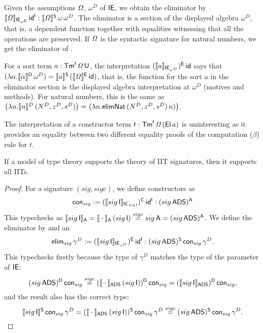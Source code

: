\documentclass[a4paper,UKenglish,cleveref, autoref]{lipics-v2019}
\begin{document}
\begin{example}
  Given the assumptions $\mathit{\Omega}$, $\omega^D$ of $\mathsf{IE}$, we obtain the
  eliminator by
  $\llbracket\mathit{\Omega}\rrbracket_{\mathsf{IE}_{\omega^{\mathsf{D}}}}\,\mathsf{id}^{\mathsf{I}} :
  \llbracket\mathit{\Omega}\rrbracket^{\mathsf{S}}\,\omega\,\omega^D$. The eliminator is a section of
  the displayed algebra $\omega^D$, that is, a dependent function
  together with equalities witnessing that all the operations are
  preserved. If $\mathit{\Omega}$ is the syntactic signature for natural
  numbers, we get the eliminator of .

  For a sort term $a:\mathsf{Tm}^{\mathsf{I}}\,\mathit{\Omega}\,\mathsf{U}$, the interpretation
  $(\llbracket a\rrbracket_{\mathsf{IE}_{\omega^D}})^{\mathsf{E}}\,\mathsf{id}$ says that
  $(\lambda\alpha.\llbracket\alpha\rrbracket^{\mathsf{D}}\,\omega^D) = \llbracket
  a\rrbracket^{\mathsf{S}}\,(\llbracket\mathit{\Omega}\rrbracket^{\mathsf{E}}\,\mathsf{id})$, that is, the function for the sort
  $a$ in the eliminator section is the displayed algebra
  interpretation at $\omega^D$ (motives and methods). For natural
  numbers, this is the same as
  $\big(\lambda n.\llbracket n\rrbracket^D\,(N^D,z^D,s^D)\big) = \big(\lambda
  n.\mathsf{elimNat}\,(N^D,z^D,s^D)\,n)\big)$.

  The interpretation of a constructor term
  $t:\mathsf{Tm}^{\mathsf{I}}\,\mathit{\Omega}\,(\mathsf{El}\,a)$ is uninteresting as it provides an
  equality between two different equality proofs of the computation
  ($\beta$) rule for $t$.
\end{example}

\begin{theorem}\label{th:tosToIITs}
  If a model of type theory supports the theory of IIT signatures,
  then it supports all IITs.
\end{theorem}
\begin{proof}
  For a signature $({sig},{sigc})$, we define constructors as
  \[
    \mathsf{con}_{sig}:= (\llbracket{sig}\,\mathsf{I}\rrbracket_{\mathsf{IC}_{{sig}\,\mathsf{I}}})^{\mathsf{C}}\,\mathsf{id}^{\mathsf{I}} : ({sig}\,\mathsf{ADS})^{\mathsf{A}}
  \]
  This typechecks as
  $\llbracket{sig}\,\mathsf{I}\rrbracket_{\mathsf{A}} = \llbracket\mathord{\hspace{1pt}\text{--}\hspace{1pt}}\rrbracket_{\mathsf{A}}\,({sig}\,\mathsf{I})
  \overset{{sigc}}{=} {{sig}\,\mathsf{A}} = ({sig}\,\mathsf{ADS})^{\mathsf{A}}$. We define the
  eliminator by
  and an
  \[
    \mathsf{elim}_{sig}\,\gamma^D := (\llbracket{sig}\,\mathsf{I}\rrbracket_{\mathsf{IE}_{\gamma^D}})^{\mathsf{E}}\,\mathsf{id}^{\mathsf{I}}  : ({sig}\,\mathsf{ADS})^{\mathsf{S}}\,\mathsf{con}_{sig}\,\gamma^D.
  \]
  This typechecks firstly because the type of $\gamma^D$ matches the
  type of the parameter of $\mathsf{IE}$:
  \[
    ({sig}\,\mathsf{ADS})^{\mathsf{D}}\,\mathsf{con}_{sig} \overset{{sigc}}{=}
    (\llbracket\mathord{\hspace{1pt}\text{--}\hspace{1pt}}\rrbracket_{\mathsf{ADS}}\,({sig}\,\mathsf{I}))^{\mathsf{D}}\,\mathsf{con}_{sig} =
    (\llbracket{sig}\,\mathsf{I}\rrbracket_{\mathsf{ADS}})^{\mathsf{D}}\,\mathsf{con}_{sig},
  \]
  and the result also has the correct type:
  \[
    \llbracket{sig}\,\mathsf{I}\rrbracket^{\mathsf{S}}\,\mathsf{con}_{sig}\,\gamma^D = (\llbracket\mathord{\hspace{1pt}\text{--}\hspace{1pt}}\rrbracket_{\mathsf{ADS}}\,({sig}\,\mathsf{I}))^{\mathsf{S}}\,\mathsf{con}_{sig}\,\gamma^D \overset{{sigc}}{=} ({sig}\,\mathsf{ADS})^{\mathsf{S}}\,\mathsf{con}_{sig}\,\gamma^D.
  \]
\end{proof}
\end{document}
